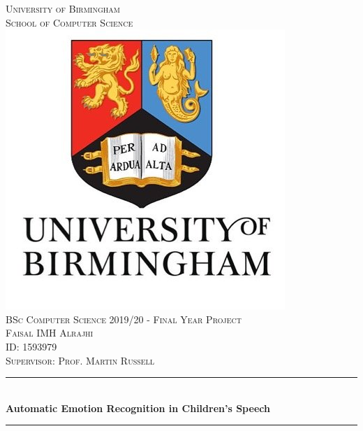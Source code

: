 \documentclass[11pt, a4paper, notitlepage]{report}
\begin{document}
		\begin{titlepage}
		\newcommand{\HRule}{\rule{\linewidth}{0.5mm}} %
		
		\center %
		
		
		\textsc{\LARGE University of Birmingham}\\[0cm] %
		\textsc{\Large School of Computer Science}\\[0.5cm] %
		\includegraphics[scale=0.25]{logo.png}\\[0cm]
		\textsc{\Large BSc Computer Science 2019/20 - Final Year Project}\\[0.5cm]
		\textsc{\Large Faisal IMH Alrajhi}\\[0cm]
		\textsc{\Large ID: 1593979} \\[0.5cm]
		\textsc{\Large Supervisor: Prof. Martin Russell}
		

		\HRule \\[0.4cm]
		{ \huge \bfseries Automatic Emotion Recognition in Children's Speech}\\[0.2cm] %
		\HRule \\[1.0cm]


\end{titlepage}
\end{document}
